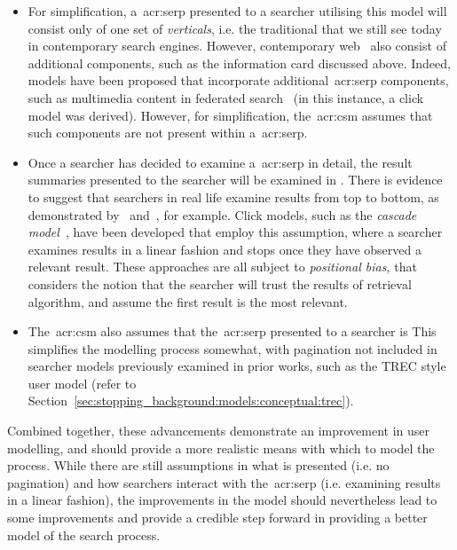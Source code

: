 \begin{itemize}
    \item{For simplification, a~\gls{acr:serp} presented to a searcher utilising this model will consist only of one set of \emph{verticals}, i.e. the traditional  that we still see today in contemporary search engines. However, contemporary web~ also consist of additional components, such as the information card discussed above. Indeed, models have been proposed that incorporate additional~\gls{acr:serp} components, such as multimedia content in federated search~\citep{chen2012federated_search_click_model} (in this instance, a click model was derived). However, for simplification, the~\gls{acr:csm} assumes that such components are not present within a~\gls{acr:serp}.}
    
    \item{Once a searcher has decided to examine a~\gls{acr:serp} in detail, the result summaries presented to the searcher will be examined in . There is evidence to suggest that searchers in real life examine results from top to bottom, as demonstrated by~\cite{joachims2002click_model} and~\cite{joachims2005click_model}, for example. Click models, such as the \emph{cascade model}~\citep{craswell2008click_models}, have been developed that employ this assumption, where a searcher examines results in a linear fashion and stops once they have observed a relevant result. These approaches are all subject to \emph{positional bias,} that considers the notion that the searcher will trust the results of retrieval algorithm, and assume the first result is the most relevant.}
    
    \item{The~\gls{acr:csm} also assumes that the~\gls{acr:serp} presented to a searcher is  This simplifies the modelling process somewhat, with pagination not included in searcher models previously examined in prior works, such as the TREC style user model (refer to Section~\ref{sec:stopping_background:models:conceptual:trec}).}
    
\end{itemize}

Combined together, these advancements demonstrate an improvement in user modelling, and should provide a more realistic means with which to model the process. While there are still assumptions in what is presented (i.e. no pagination) and how searchers interact with the~\gls{acr:serp} (i.e. examining results in a linear fashion), the improvements in the model should nevertheless lead to some improvements and provide a credible step forward in providing a better model of the search process.

